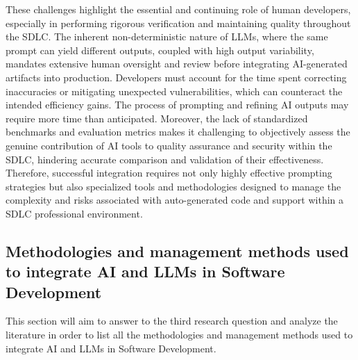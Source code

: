 These challenges highlight the essential and continuing role of human developers, especially in performing rigorous verification and maintaining quality throughout the SDLC. The inherent non-deterministic nature of LLMs, where the same prompt can yield different outputs, coupled with high output variability, mandates extensive human oversight and review before integrating AI-generated artifacts into production. Developers must account for the time spent correcting inaccuracies or mitigating unexpected vulnerabilities, which can counteract the intended efficiency gains. The process of prompting and refining AI outputs may require more time than anticipated. Moreover, the lack of standardized benchmarks and evaluation metrics makes it challenging to objectively assess the genuine contribution of AI tools to quality assurance and security within the SDLC, hindering accurate comparison and validation of their effectiveness. Therefore, successful integration requires not only highly effective prompting strategies but also specialized tools and methodologies designed to manage the complexity and risks associated with auto-generated code and support within a SDLC professional environment.

\subsection{Methodologies and management methods used to integrate AI and LLMs in Software Development}

This section will aim to answer to the third research question and analyze the literature in order to list all the methodologies and management methods used to integrate AI and LLMs in Software Development.

